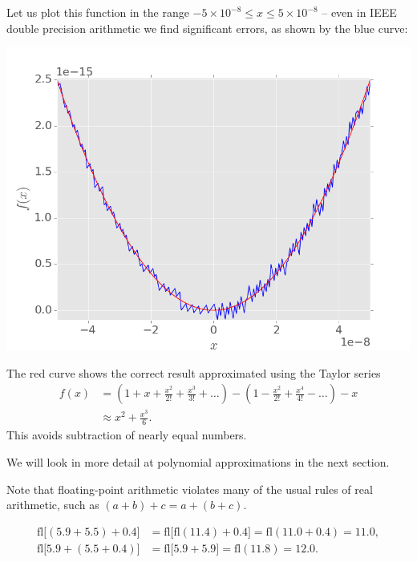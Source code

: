 \documentclass[
  letterpaper,
  DIV=11,
  numbers=noendperiod]{scrreprt}
\begin{document}
Let us plot this function in the range
\(-5\times 10^{-8}\leq x \leq 5\times 10^{-8}\) -- even in IEEE double
precision arithmetic we find significant errors, as shown by the blue
curve:

\begin{center}
\includegraphics[width=0.7\linewidth,height=\textheight,keepaspectratio]{im/floating1.png}
\end{center}

The red curve shows the correct result approximated using the Taylor
series \[
\begin{aligned}
f(x) &= \left(1 + x + \frac{x^2}{2!} + \frac{x^3}{3!} + \ldots\right) - \left( 1 - \frac{x^2}{2!} + \frac{x^4}{4!} - \ldots\right) - x\\
&\approx x^2 + \frac{x^3}{6}.
\end{aligned}
\] This avoids subtraction of nearly equal numbers.

\begin{tcolorbox}[enhanced jigsaw, bottomtitle=1mm, title=\textcolor{quarto-callout-note-color}{\faInfo}\hspace{0.5em}{Note}, colback=white, opacityback=0, rightrule=.15mm, bottomrule=.15mm, colbacktitle=quarto-callout-note-color!10!white, colframe=quarto-callout-note-color-frame, arc=.35mm, breakable, coltitle=black, leftrule=.75mm, left=2mm, toptitle=1mm, toprule=.15mm, titlerule=0mm, opacitybacktitle=0.6]

We will look in more detail at polynomial approximations in the next
section.

\end{tcolorbox}

Note that floating-point arithmetic violates many of the usual rules of
real arithmetic, such as \((a+b)+c = a + (b+c)\).

\[
\begin{aligned}
\mathrm{fl}\big[(5.9 + 5.5) + 0.4\big] &= \mathrm{fl}\big[\mathrm{fl}(11.4) + 0.4\big] = \mathrm{fl}(11.0 + 0.4) = 11.0,\\
\mathrm{fl}\big[5.9 + (5.5 + 0.4)\big] &= \mathrm{fl}\big[5.9 + 5.9 \big] = \mathrm{fl}(11.8) = 12.0.
\end{aligned}
\]
\end{document}

